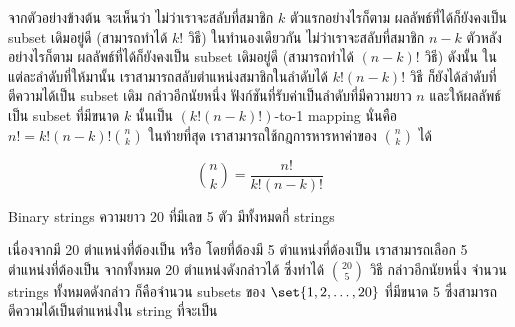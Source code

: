 จากตัวอย่างข้างต้น จะเห็นว่า ไม่ว่าเราจะสลับที่สมาชิก $k$ ตัวแรกอย่างไรก็ตาม ผลลัพธ์ที่ได้ก็ยังคงเป็น subset เดิมอยู่ดี (สามารถทำได้ $k!$ วิธี) \enskip ในทำนองเดียวกัน ไม่ว่าเราจะสลับที่สมาชิก $n-k$ ตัวหลังอย่างไรก็ตาม ผลลัพธ์ที่ได้ก็ยังคงเป็น subset เดิมอยู่ดี (สามารถทำได้ $(n-k)!$ วิธี) \enskip ดังนั้น ในแต่ละลำดับที่ให้มานั้น เราสามารถสลับตำแหน่งสมาชิกในลำดับได้ $k!(n-k)!$ วิธี ก็ยังได้ลำดับที่ตีความได้เป็น subset เดิม \enskip กล่าวอีกนัยหนึ่ง ฟังก์ชันที่รับค่าเป็นลำดับที่มีความยาว $n$ และให้ผลลัพธ์เป็น subset ที่มีขนาด $k$ นั้นเป็น $(k!(n-k)!)$-to-1 mapping นั่นคือ $n!=k!(n-k)!\binom{n}{k}$ \enskip ในท้ายที่สุด เราสามารถใช้กฎการหารหาค่าของ $\binom{n}{k}$ ได้

\begin{theorem}
\[\binom{n}{k}=\frac{n!}{k!(n-k)!}\]
\end{theorem}

\begin{example}
Binary strings ความยาว 20 ที่มีเลข  5 ตัว มีทั้งหมดกี่ strings

เนื่องจากมี 20 ตำแหน่งที่ต้องเป็น  หรือ  โดยที่ต้องมี 5 ตำแหน่งที่ต้องเป็น  เราสามารถเลือก 5 ตำแหน่งที่ต้องเป็น  จากทั้งหมด 20 ตำแหน่งดังกล่าวได้ ซึ่งทำได้ $\binom{20}{5}$ วิธี \enskip กล่าวอีกนัยหนึ่ง จำนวน strings ทั้งหมดดังกล่าว ก็คือจำนวน subsets ของ $\set{1,2,\ldots,20}$ ที่มีขนาด 5 ซึ่งสามารถตีความได้เป็นตำแหน่งใน string ที่จะเป็น 
\end{example}
